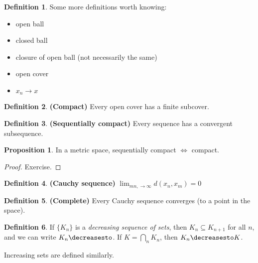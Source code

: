 \documentclass[a5paper]{article}
\theoremstyle{definition}%
\newtheorem*{proposition*}{Proposition}
\newtheorem*{definition*}{Definition}
\numberwithin{exercise}{section}
\theoremstyle{remark}%
\begin{document}
\begin{definition*}
Some more definitions worth knowing: 
\begin{itemize}
	\item open ball
	\item closed ball
	\item closure of open ball (not necessarily the same)
	\item open cover
	\item $x_n\to x$
\end{itemize}
\end{definition*}

\begin{definition*}\textbf{(Compact)} Every open cover has a finite subcover.
\end{definition*}

\begin{definition*}
\textbf{(Sequentially compact)} Every sequence has a convergent subsequence. 
\end{definition*}

\begin{proposition*}
In a metric space, sequentially compact $\iff$ compact. 
\end{proposition*}
\begin{highlight}
\begin{proof}
Exercise.
\end{proof}
\end{highlight}

\begin{definition*}
\textbf{(Cauchy sequence)} $\lim_{mn,\to \infty} d(x_n, x_m)=0$
\end{definition*}

\begin{definition*}
\textbf{(Complete)} Every Cauchy sequence converges (to a point in the space).
\end{definition*}


\begin{definition*}
If $\{K_n\}$ is a \emph{decreasing sequence of sets}, then $K_{n}\subseteq K_{n+1}$ for all $n$, and we can write $K_n\decreasesto$\;. If $K=\bigcap_n K_n$, then $K_n\decreasesto K$. 

Increasing sets are defined similarly. 
\end{definition*}
\end{document}
